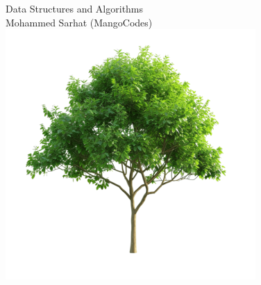 
\begin{titlepage}
    \begin{center}
    \Huge{Data Structures and Algorithms}\\[1cm]
    \Large{Mohammed Sarhat (MangoCodes)}\\[5cm]
    \includegraphics[width=\textwidth]{./tree.png}
    \end{center}
\end{titlepage}